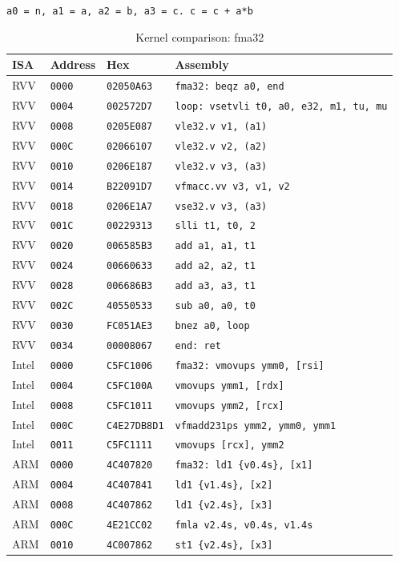 \begin{table}[htbp]
\centering
\caption{Kernel comparison: fma32}
\begingroup
\scriptsize
\setlength{\tabcolsep}{4pt}
\noindent \texttt{a0 = n, a1 = a, a2 = b, a3 = c. c = c + a*b}\par
\vspace{0.6ex}
\begin{tabular}{@{}l|l|l|p{7.2cm}@{}}
\toprule
ISA & Address & Hex & Assembly \\
\midrule
RVV & \texttt{0000} & \texttt{02050A63} & \texttt{fma32: beqz a0, end} \\
RVV & \texttt{0004} & \texttt{002572D7} & \texttt{loop: vsetvli t0, a0, e32, m1, tu, mu} \\
RVV & \texttt{0008} & \texttt{0205E087} & \texttt{vle32.v v1, (a1)} \\
RVV & \texttt{000C} & \texttt{02066107} & \texttt{vle32.v v2, (a2)} \\
RVV & \texttt{0010} & \texttt{0206E187} & \texttt{vle32.v v3, (a3)} \\
RVV & \texttt{0014} & \texttt{B22091D7} & \texttt{vfmacc.vv v3, v1, v2} \\
RVV & \texttt{0018} & \texttt{0206E1A7} & \texttt{vse32.v v3, (a3)} \\
RVV & \texttt{001C} & \texttt{00229313} & \texttt{slli t1, t0, 2} \\
RVV & \texttt{0020} & \texttt{006585B3} & \texttt{add a1, a1, t1} \\
RVV & \texttt{0024} & \texttt{00660633} & \texttt{add a2, a2, t1} \\
RVV & \texttt{0028} & \texttt{006686B3} & \texttt{add a3, a3, t1} \\
RVV & \texttt{002C} & \texttt{40550533} & \texttt{sub a0, a0, t0} \\
RVV & \texttt{0030} & \texttt{FC051AE3} & \texttt{bnez a0, loop} \\
RVV & \texttt{0034} & \texttt{00008067} & \texttt{end: ret} \\
\midrule
Intel & \texttt{0000} & \texttt{C5FC1006} & \texttt{fma32: vmovups ymm0, [rsi]} \\
Intel & \texttt{0004} & \texttt{C5FC100A} & \texttt{vmovups ymm1, [rdx]} \\
Intel & \texttt{0008} & \texttt{C5FC1011} & \texttt{vmovups ymm2, [rcx]} \\
Intel & \texttt{000C} & \texttt{C4E27DB8D1} & \texttt{vfmadd231ps ymm2, ymm0, ymm1} \\
Intel & \texttt{0011} & \texttt{C5FC1111} & \texttt{vmovups [rcx], ymm2} \\
\midrule
ARM & \texttt{0000} & \texttt{4C407820} & \texttt{fma32: ld1 \{v0.4s\}, [x1]} \\
ARM & \texttt{0004} & \texttt{4C407841} & \texttt{ld1 \{v1.4s\}, [x2]} \\
ARM & \texttt{0008} & \texttt{4C407862} & \texttt{ld1 \{v2.4s\}, [x3]} \\
ARM & \texttt{000C} & \texttt{4E21CC02} & \texttt{fmla v2.4s, v0.4s, v1.4s} \\
ARM & \texttt{0010} & \texttt{4C007862} & \texttt{st1 \{v2.4s\}, [x3]} \\
\bottomrule
\end{tabular}
\endgroup
\end{table}
\noindent{}\par
